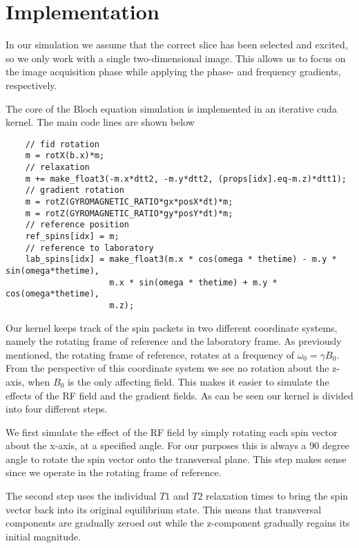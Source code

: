 \section{Implementation}



In our simulation we assume that the correct slice has been selected
and excited, so we only work with a single two-dimensional image. This
allows us to focus on the image acquisition phase while applying the
phase- and frequency gradients, respectively.

The core of the Bloch equation simulation is implemented in an
iterative cuda kernel. The main code lines are shown below
\begin{strip}
\begin{lstlisting}
    // fid rotation
    m = rotX(b.x)*m;
    // relaxation
    m += make_float3(-m.x*dtt2, -m.y*dtt2, (props[idx].eq-m.z)*dtt1);
    // gradient rotation
    m = rotZ(GYROMAGNETIC_RATIO*gx*posX*dt)*m;
    m = rotZ(GYROMAGNETIC_RATIO*gy*posY*dt)*m;
    // reference position
    ref_spins[idx] = m;
    // reference to laboratory
    lab_spins[idx] = make_float3(m.x * cos(omega * thetime) - m.y * sin(omega*thetime), 
                     m.x * sin(omega * thetime) + m.y * cos(omega*thetime),  
                     m.z);
\end{lstlisting}
\end{strip}
Our kernel keeps track of the spin packets in two different coordinate
systems, namely the rotating frame of reference and the laboratory
frame. As previously mentioned, the rotating frame of reference,
rotates at a frequency of $\omega_0=\gamma B_0$. From the perspective
of this coordinate system we see no rotation about the z-axis, when
$B_0$ is the only affecting field. This makes it easier to simulate
the effects of the RF field and the gradient fields. As can be seen our
kernel is divided into four different steps. 

We first simulate the effect of the RF field by simply rotating each
spin vector about the x-axis, at a specified angle. For our purposes
this is always a 90 degree angle to rotate the spin vector onto the
transversal plane. This step makes sense since we operate in the
rotating frame of reference.

The second step uses the individual $T1$ and $T2$ relaxation times to
bring the spin vector back into its original equilibrium state. This
means that transversal components are gradually zeroed out while the
z-component gradually regains its initial magnitude.

